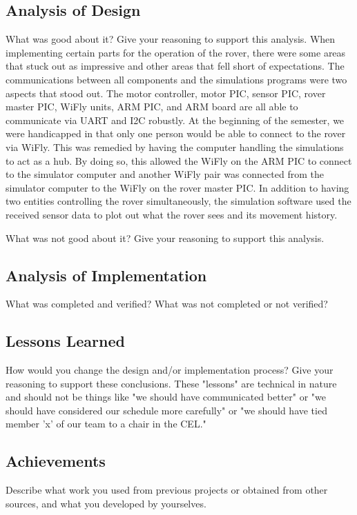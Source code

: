 \subsection{Analysis of Design}
What was good about it? Give your reasoning to support this analysis.
When implementing certain parts for the operation of the rover, there were some areas that stuck out as impressive and other areas that fell short of expectations. The communications between all components and the simulations programs were two aspects that stood out. The motor controller, motor PIC, sensor PIC, rover master PIC, WiFly units, ARM PIC, and ARM board are all able to communicate via UART and I2C robustly. At the beginning of the semester, we were handicapped in that only one person would be able to connect to the rover via WiFly. This was remedied by having the computer handling the simulations to act as a hub. By doing so, this allowed the WiFly on the ARM PIC to connect to the simulator computer and another WiFly pair was connected from the simulator computer to the WiFly on the rover master PIC. In addition to having two entities controlling the rover simultaneously, the simulation software used the received sensor data to plot out what the rover sees and its movement history.

What was not good about it? Give your reasoning to support this analysis.


\subsection{Analysis of Implementation}
What was completed and verified? What was not completed or not verified?

\subsection{Lessons Learned}
How would you change the design and/or implementation process? Give your reasoning to support these conclusions. These "lessons" are technical in nature and should not be things like "we should have communicated better" or "we should have considered our schedule more carefully" or "we should have tied member 'x' of our team to a chair in the CEL."

\subsection{Achievements}
Describe what work you used from previous projects or obtained from other sources, and what you developed by yourselves.

